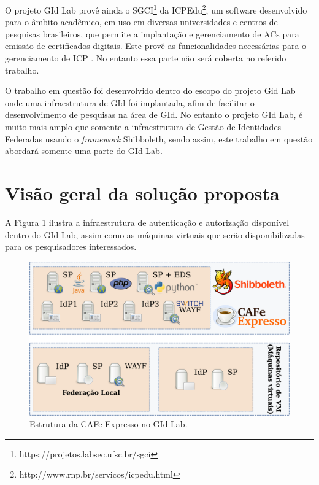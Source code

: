 O projeto GId Lab provê ainda o \ac{SGCI}\footnote{https://projetos.labsec.ufsc.br/sgci} da \ac{ICPEdu}\footnote{http://www.rnp.br/servicos/icpedu.html}, um software desenvolvido para o âmbito acadêmico, em uso em diversas universidades e centros de pesquisas brasileiros, que permite a implantação e gerenciamento de \acp{AC} para emissão de certificados digitais. Este provê as funcionalidades necessárias para o gerenciamento de \acf{ICP} \cite{wangham:13}. No entanto essa parte não será coberta no referido trabalho.

O trabalho em questão foi desenvolvido dentro do escopo do projeto Gid Lab \cite{wangham:13} onde uma infraestrutura de \ac{GId} foi implantada, afim de facilitar o desenvolvimento de pesquisas na área de GId. No entanto o projeto GId Lab, é muito mais amplo que somente a infraestrutura de Gestão de Identidades Federadas usando o \textit{framework} Shibboleth, sendo assim, este trabalho em questão abordará somente uma parte do GId Lab.

\section{Visão geral da solução proposta}
\label{s_c4_visao}

A Figura \ref{fig_8} ilustra a infraestrutura de autenticação e autorização disponível dentro do GId Lab, assim como as máquinas virtuais que serão disponibilizadas para os pesquisadores interessados.

\begin{figure}[!htpb]
 \centering
 \includegraphics[width=1\textwidth]{figuras/infra-cafeexpresso.png}
 \caption{Estrutura da CAFe Expresso no GId Lab.}
 \label{fig_8}
\end{figure}


